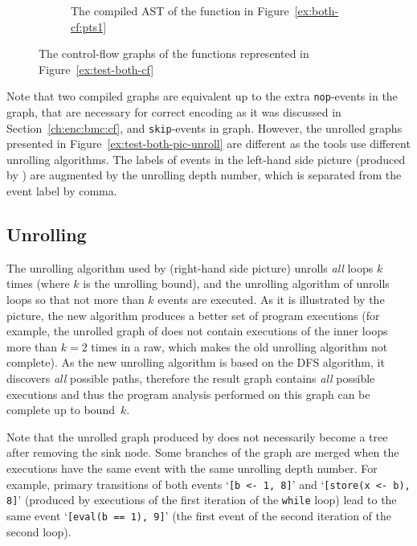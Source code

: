\begin{figure}[!h]
\begin{subfigure}[b]{.49\textwidth}
  \hfill
  \caption{The compiled AST of the function in Figure~\ref{ex:both-cf:pts1}}
  \label{ex:both-cf:graph:pts1}
\end{subfigure}
%
\caption{The control-flow graphs of the functions represented in Figure~\ref{ex:test-both-cf}}
\label{ex:test-both-pic}
\end{figure}

Note that two compiled graphs are equivalent up to the extra \texttt{nop}-events in the \porthos[2] graph, that are necessary for correct encoding as it was discussed in Section~\ref{ch:enc:bmc:cf}, and \texttt{skip}-events in \porthos[1] graph.
However, the unrolled graphs presented in Figure~\ref{ex:test-both-pic-unroll} are different as the tools use different unrolling algorithms.
The labels of events in the left-hand side picture (produced by \porthos[2]) are augmented by the unrolling depth number, which is separated from the event label by comma.


\subsection{Unrolling}
\label{ch:eval:show:unrol}

The unrolling algorithm used by \porthos[1] (right-hand side picture) unrolls \textit{all} loops $k$ times (where $k$ is the unrolling bound), and the unrolling algorithm of \porthos[2] unrolls loops so that not more than $k$ events are executed.
As it is illustrated by the picture, the new algorithm produces a better set of program executions (for example, the unrolled graph of \porthos[1] does not contain executions of the inner loops more than $k=2$ times in a raw, which makes the old unrolling algorithm not complete).
As the new unrolling algorithm is based on the DFS algorithm, it discovers \textit{all} possible paths, therefore the result graph contains \textit{all} possible executions and thus the program analysis performed on this graph can be complete up to bound~$k$.

Note that the unrolled graph produced by \porthos[2] does not necessarily become a tree after removing the sink node.
Some branches of the graph are merged when the executions have the same event with the same unrolling depth number.
For example, primary transitions of both events `\lstinline{[b <- 1, 8]}' and `\lstinline{[store(x <- b), 8]}' (produced by executions of the first iteration of the \texttt{while} loop) lead to the same event `\lstinline{[eval(b == 1), 9]}' (the first event of the second iteration of the second loop).


